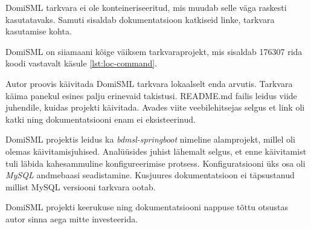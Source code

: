 DomiSML tarkvara ei ole konteineriseeritud, mis muudab selle väga raskesti kasutatavaks. 
Samuti sisaldab dokumentatsioon katkiseid linke, tarkvara kasutamise kohta.

DomiSML on siiamaani kõige väiksem tarkvaraprojekt, 
mis sisaldab 176307 rida koodi vastavalt käsule \ref{lst:loc-command}.  

Autor proovis käivitada DomiSML tarkvara lokaalselt enda arvutis.
Tarkvara käima panekul esines palju erinevaid takistusi.
README.md failis leidus viide juhendile, kuidas projekti käivitada. 
Avades viite veebilehitsejas selgus et link oli katki ning dokumentatsiooni enam ei eksisteerinud.

DomiSML projektis leidus ka \textit{bdmsl-springboot} nimeline alamprojekt,
millel oli olemas käivitamisjuhised. Analüüsides juhist lähemalt selgus, et 
enne käivitamist tuli läbida kahesammuline konfigureerimise protsess.
Konfiguratsiooni üks osa oli \textit{MySQL} andmebaasi seadistamine. 
Kusjuures dokumentatsioon ei täpsustanud millist MySQL versiooni tarkvara ootab.

DomiSML projekti keerukuse ning dokumentatsiooni nappuse 
tõttu otsustas autor sinna aega mitte investeerida. 
